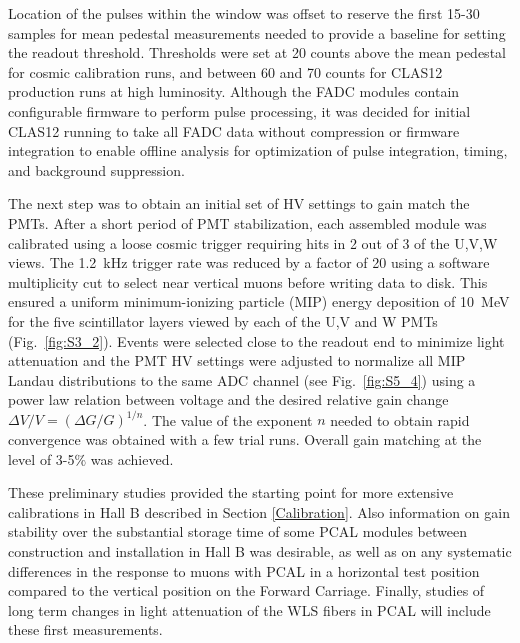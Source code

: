 Location of the pulses within the window was offset to reserve the first 15-30 samples for mean pedestal measurements needed
to provide a baseline for setting the readout threshold. Thresholds were set at 20 counts above the mean
pedestal for cosmic calibration runs, and between 60 and 70 counts for CLAS12 production runs at high luminosity. Although the FADC modules contain configurable firmware to perform pulse processing, it was decided for initial CLAS12 running to take all FADC data without compression or firmware integration to enable offline analysis for
optimization of pulse integration, timing, and background suppression.

The next step was to obtain an initial set of HV settings to gain match the PMTs. After a short period of PMT
stabilization, each assembled module was calibrated using a loose cosmic trigger requiring hits in 2 out of 3 of
the U,V,W views. The 1.2~kHz trigger rate was reduced by a factor of 20 using a software multiplicity cut to
select near vertical muons before writing data to disk. This ensured a uniform minimum-ionizing particle (MIP)
energy deposition of 10~MeV for the five scintillator layers viewed by each of the U,V and W PMTs (Fig.~\ref{fig:S3_2}). Events were selected
close to the readout end to minimize light attenuation and the PMT HV settings were adjusted to normalize all
MIP Landau distributions to the same ADC channel (see Fig.~\ref{fig:S5_4}) using a power law relation between
voltage and the desired relative gain change $\Delta V/V = (\Delta G/G)^{1/n}$. The value of the exponent $n$
needed to obtain rapid convergence was obtained with a few trial runs. Overall gain matching at the level of
3-5$\%$ was achieved.

These preliminary studies provided the starting point for more extensive calibrations in Hall B described in
Section \ref{Calibration}. Also information on gain stability over the substantial storage time of some PCAL
modules between construction and installation in Hall B was desirable, as well as on any systematic differences in
the response to muons with PCAL in a horizontal test position compared to the vertical position on the Forward
Carriage. Finally, studies of long term changes in light attenuation of the WLS fibers in PCAL will include these
first measurements.



